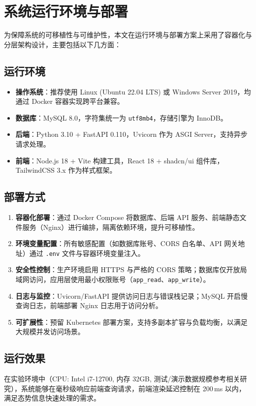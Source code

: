 \bigskip

\section{系统运行环境与部署}

为保障系统的可移植性与可维护性，本文在运行环境与部署方案上采用了容器化与分层架构设计，主要包括以下几方面：

\subsection{运行环境}
\begin{itemize}
  \item \textbf{操作系统}：推荐使用 Linux (Ubuntu 22.04 LTS) 或 Windows Server 2019，均通过 Docker 容器实现跨平台兼容。
  \item \textbf{数据库}：MySQL 8.0，字符集统一为 \texttt{utf8mb4}，存储引擎为 InnoDB。
  \item \textbf{后端}：Python 3.10 + FastAPI 0.110，Uvicorn 作为 ASGI Server，支持异步请求处理。
  \item \textbf{前端}：Node.js 18 + Vite 构建工具，React 18 + shadcn/ui 组件库，TailwindCSS 3.x 作为样式框架。
\end{itemize}

\subsection{部署方式}
\begin{enumerate}
  \item \textbf{容器化部署}：通过 Docker Compose 将数据库、后端 API 服务、前端静态文件服务（Nginx）进行编排，隔离依赖环境，提升可移植性。
  \item \textbf{环境变量配置}：所有敏感配置（如数据库账号、CORS 白名单、API 网关地址）通过 \texttt{.env} 文件与容器环境变量注入。
  \item \textbf{安全性控制}：生产环境启用 HTTPS 与严格的 CORS 策略；数据库仅开放局域网访问，应用层使用最小权限账号（\texttt{app\_read}、\texttt{app\_write}）。
  \item \textbf{日志与监控}：Uvicorn/FastAPI 提供访问日志与错误栈记录；MySQL 开启慢查询日志，前端部署 Nginx 日志用于访问分析。
  \item \textbf{可扩展性}：预留 Kubernetes 部署方案，支持多副本扩容与负载均衡，以满足大规模并发访问场景。
\end{enumerate}

\subsection{运行效果}
在实验环境中（CPU: Intel i7-12700, 内存 32GB, 测试/演示数据规模参考相关研究），系统能够在毫秒级响应前端查询请求，前端渲染延迟控制在 200\,ms 以内，满足态势信息快速处理的需求。

